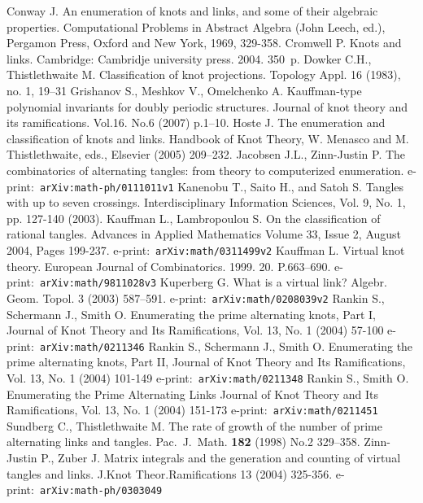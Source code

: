 \documentclass[12pt]{article}
\begin{document}
\begin{thebibliography}{99}
 Conway J. An enumeration of knots and links, and some of their algebraic
properties. Computational Problems in Abstract Algebra (John Leech, ed.), Pergamon Press, Oxford
and New York, 1969, 329-358.
 Cromwell P. Knots and links. Cambridge: Cambridje university press. 2004.
350~p.
 Dowker C.H., Thistlethwaite M. Classification of knot projections. Topology Appl. 16
(1983), no. 1, 19--31
 Grishanov S., Meshkov V., Omelchenko A. Kauffman-type polynomial invariants
for doubly periodic structures. Journal of knot theory and its ramifications. Vol.16. No.6 (2007)
p.1--10.
 Hoste J. The enumeration and classification of knots and links.
Handbook of Knot Theory, W. Menasco and M. Thistlethwaite, eds., Elsevier (2005) 209--232.
 Jacobsen J.L., Zinn-Justin P. The combinatorics of alternating tangles:
from theory to computerized enumeration. e-print:~\texttt{arXiv:math-ph/0111011v1}
 Kanenobu T., Saito H., and Satoh S. Tangles with up to seven crossings.
Interdisciplinary Information Sciences, Vol. 9, No. 1, pp. 127-140 (2003).
 Kauffman L., Lambropoulou S. On the classification of rational tangles.
Advances in Applied Mathematics Volume 33, Issue 2, August 2004, Pages 199-237.
e-print:~\texttt{arXiv:math/0311499v2}
 Kauffman L. Virtual knot theory. European Journal of Combinatorics. 1999.
20. P.663--690.  e-print:~\texttt{arXiv:math/9811028v3}
 Kuperberg G. What is a virtual link? Algebr. Geom. Topol. 3 (2003) 587--591.
e-print:~\texttt{arXiv:math/0208039v2}
 Rankin S., Schermann J., Smith O. Enumerating the prime alternating knots, Part
I, Journal of Knot Theory and Its Ramifications, Vol. 13, No. 1 (2004) 57-100
e-print:~\texttt{arXiv:math/0211346}
 Rankin S., Schermann J., Smith O.
Enumerating the prime alternating knots, Part II, Journal of Knot Theory and Its Ramifications,
Vol. 13, No. 1 (2004) 101-149 e-print:~\texttt{arXiv:math/0211348}
 Rankin S., Smith O. Enumerating the Prime Alternating Links
Journal of Knot Theory and Its Ramifications, Vol. 13, No. 1 (2004) 151-173
e-print:~\texttt{arXiv:math/0211451}
 Sundberg C., Thistlethwaite M. The rate of growth of the number of
prime alternating links and tangles. Pac.~J.~Math. {\bf182} (1998) No.2 329--358.
 Zinn-Justin P., Zuber J. Matrix integrals and the generation and counting
of virtual tangles and links. J.Knot Theor.Ramifications 13 (2004) 325-356.
e-print:~\texttt{arXiv:math-ph/0303049}
\end{thebibliography}
\end{document}
